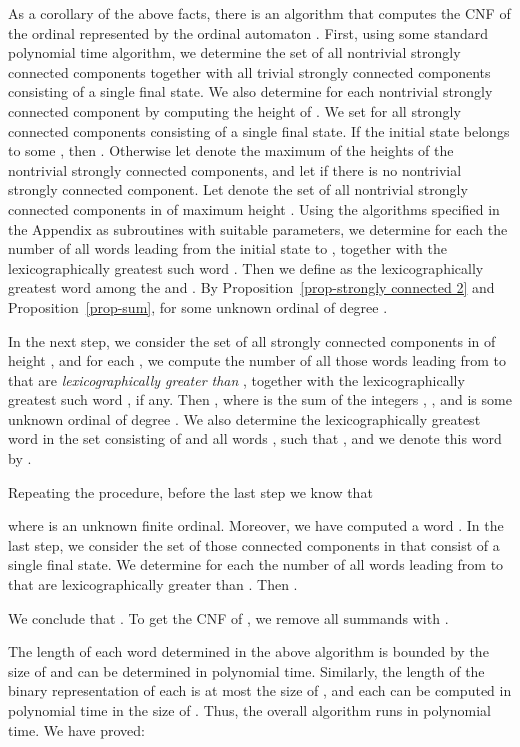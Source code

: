\documentclass[copyright]{eptcs}
\begin{document}
As a corollary of the above facts, there is an algorithm 
that computes the CNF of the ordinal  represented
by the ordinal automaton . First, using some  standard polynomial time
algorithm,  we determine the set   
of all nontrivial strongly connected components together with all 
trivial strongly connected components consisting of 
a single final state. We also determine  for each nontrivial 
strongly  connected component 
by computing the height  of . We set 
for all strongly connected components  consisting
of a single final state.  If the initial state belongs to
some , then . 
Otherwise let  denote the maximum of the heights of the 
nontrivial strongly connected components, and let  if there 
is no nontrivial strongly connected component. Let  denote the set 
of all nontrivial strongly connected components in 
of maximum height . 
Using the algorithms specified in the Appendix as subroutines
with suitable parameters,
we determine for each  the number  of all words  
leading from the initial state  to , together with the 
lexicographically greatest such word . Then we define  as the lexicographically 
greatest word among the  and .
By Proposition~\ref{prop-strongly connected 2}
and Proposition~\ref{prop-sum},  for some 
unknown ordinal  of degree . 

In the next step, we consider the set  of all 
strongly connected components  in  of height , 
and for each , we compute the number  of all those words 
leading from  to  that are \emph{lexicographically greater
than} , together with the lexicographically greatest such word
, if any. Then , 
where  is the sum of the integers , ,
 and  is some unknown ordinal of degree . 
We also determine the lexicographically greatest 
word in the set consisting of  and all words ,  
such that , and we denote this word by . 

Repeating the procedure, before the last step we know that 

where  is an unknown finite ordinal. Moreover, we have computed a word 
. In the last step, we consider the set  of those connected
components in  that consist of a single final state. We determine
for each  the number of all words leading from  
to  that are lexicographically greater than . Then 
.

We conclude that .
To get the CNF of , we remove all summands  with . 

The length of each word  determined in the above algorithm is 
bounded by the size of  and can be determined in 
polynomial time. Similarly, the length
of the binary representation of each  is at most the size of ,
and each  can be computed in polynomial time in the size of .
Thus, the overall algorithm runs in polynomial time.  
We have proved:
\end{document}
